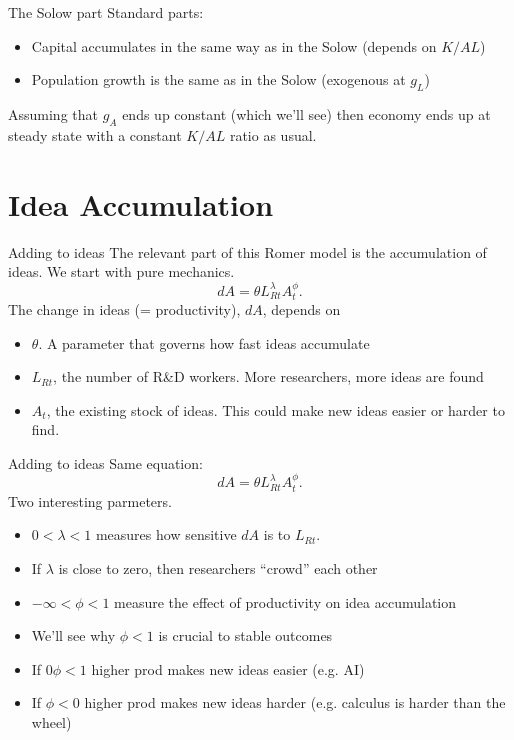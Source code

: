 \begin{frame}{The Solow part}
Standard parts:
\begin{itemize}
	\item Capital accumulates in the same way as in the Solow (depends on $K/AL$)
	\item Population growth is the same as in the Solow (exogenous at $g_L$)
\end{itemize}
Assuming that $g_A$ ends up constant (which we'll see) then economy ends up at steady state with a constant $K/AL$ ratio as usual.
\end{frame}

\section{Idea Accumulation}
\begin{frame}{Adding to ideas}
The relevant part of this Romer model is the accumulation of ideas. We start with pure mechanics.
\begin{equation}
	dA = \theta L_{Rt}^{\lambda} A_t^{\phi}. \label{EQ_dotA}
\end{equation}
The change in ideas (= productivity), $dA$, depends on
\begin{itemize}
	\item $\theta$. A parameter that governs how fast ideas accumulate
	\item $L_{Rt}$, the number of R\&D workers. More researchers, more ideas are found
	\item $A_t$, the existing stock of ideas. This could make new ideas easier or harder to find.
\end{itemize}
\end{frame}

\begin{frame}{Adding to ideas}
Same equation:
\begin{equation}
	dA = \theta L_{Rt}^{\lambda} A_t^{\phi}. \label{EQ_dotA}
\end{equation}
Two interesting parmeters. 
\begin{itemize}
	\item $0 < \lambda < 1$ measures how sensitive $dA$ is to $L_{Rt}$.
	\item If $\lambda$ is close to zero, then researchers ``crowd'' each other
	\item $-\infty < \phi < 1$ measure the effect of productivity on idea accumulation
	\item We'll see why $\phi < 1$ is crucial to stable outcomes
	\item If $0 \phi < 1$ higher prod makes new ideas easier (e.g. AI)
	\item If $\phi < 0$ higher prod makes new ideas harder (e.g. calculus is harder than the wheel)
\end{itemize}
\end{frame}

